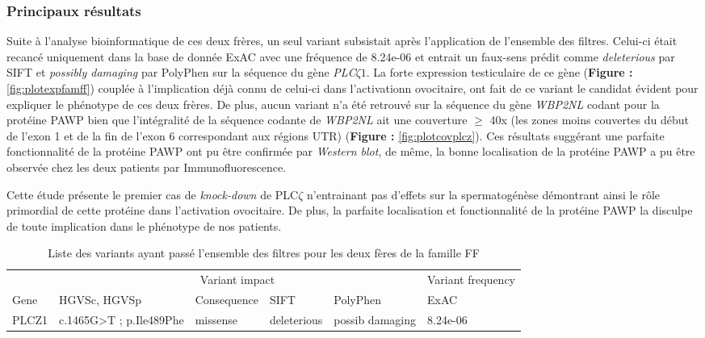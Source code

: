 \documentclass[12pt,twoside]{reedthesis}
\theoremstyle{definition}
\theoremstyle{definition}
\theoremstyle{remark}
\begin{document}
  \newpage
  
  
  
  \newpage
  
  \subsubsection{Principaux résultats}\label{principaux-resultats-1}
  
  Suite à l'analyse bioinformatique de ces deux frères, un seul variant
  subsistait après l'application de l'ensemble des filtres. Celui-ci était
  recancé uniquement dans la base de donnée ExAC avec une fréquence de
  8.24e-06 et entrait un faux-sens prédit comme \emph{deleterious} par
  SIFT et \emph{possibly damaging} par PolyPhen sur la séquence du gène
  \emph{PLC}\(\zeta 1\). La forte expression testiculaire de ce gène
  (\textbf{Figure : }\ref{fig:plotexpfamff}) couplée à l'implication déjà
  connu de celui-ci dans l'activationn ovocitaire, ont fait de ce variant
  le candidat évident pour expliquer le phénotype de ces deux frères. De
  plus, aucun variant n'a été retrouvé sur la séquence du gène
  \emph{WBP2NL} codant pour la protéine PAWP bien que l'intégralité de la
  séquence codante de \emph{WBP2NL} ait une couverture \(\ge\) 40x (les
  zones moins couvertes du début de l'exon 1 et de la fin de l'exon 6
  correspondant aux régions UTR) (\textbf{Figure :
  }\ref{fig:plotcovplcz}). Ces résultats suggérant une parfaite
  fonctionnalité de la protéine PAWP ont pu être confirmée par
  \emph{Western blot}, de même, la bonne localisation de la protéine PAWP
  a pu être observée chez les deux patients par Immunofluorescence.
  
  Cette étude présente le premier cas de \emph{knock-down} de PLC\(\zeta\)
  n'entrainant pas d'effets sur la spermatogénèse démontrant ainsi le rôle
  primordial de cette protéine dans l'activation ovocitaire. De plus, la
  parfaite localisation et fonctionnalité de la protéine PAWP la disculpe
  de toute implication dans le phénotype de nos patients.
  
  \begin{longtable}[t]{llllll}
  \caption{\label{tab:tabrecapff}Liste des variants ayant passé l'ensemble des filtres pour les deux fères de la famille FF}\\
  \toprule
  \multicolumn{1}{c}{ } & \multicolumn{4}{c}{Variant impact} & \multicolumn{1}{c}{Variant frequency} \\
  \cmidrule(l{2pt}r{2pt}){2-5} \cmidrule(l{2pt}r{2pt}){6-6}
  Gene & HGVSc, HGVSp & Consequence & SIFT & PolyPhen & ExAC\\
  \midrule
  PLCZ1 & c.1465G>T ; p.Ile489Phe & missense & deleterious & possib damaging & 8.24e-06\\
  \bottomrule
  \end{longtable}
  
\end{document}
